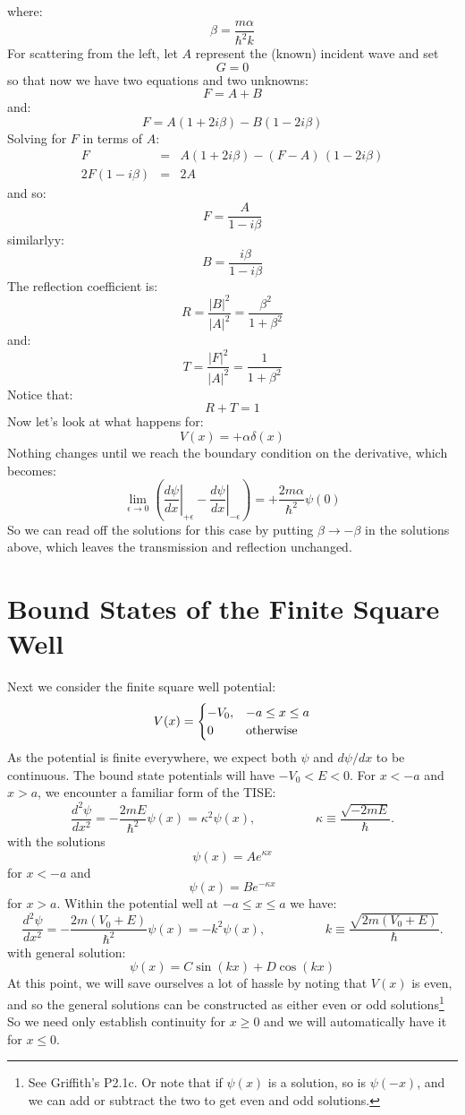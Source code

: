\documentclass[12pt]{book}
\begin{document}
where:
$$\beta = \frac{m \alpha}{\hbar^2 k}$$
For scattering from the left, let $A$ represent the (known) incident wave and set
$$G=0$$ so that now we have two equations and two unknowns:
$$F = A + B$$
and:
$$F = A (1+2i\beta) - B (1-2i\beta) $$
Solving for $F$ in terms of $A$:
\begin{eqnarray*}
F &=& A (1+2i\beta) - (F-A)\,(1-2i\beta)\\
2F(1-i\beta) &=& 2A 
\end{eqnarray*}
and so:
$$F = \frac{A}{1-i\beta}$$
similarlyy:
$$B = \frac{i\beta}{1-i\beta}$$
The reflection coefficient is:
$$R = \frac{|B|^2}{|A|^2} = \frac{\beta^2}{1+\beta^2}$$
and:
$$T = \frac{|F|^2}{|A|^2} = \frac{1}{1+\beta^2}$$
Notice that:
$$R+T=1$$
Now let's look at what happens for:
$$V(x) = +\alpha \delta(x)$$
Nothing changes until we reach the boundary condition on the derivative, which becomes:
$$
\lim_{\epsilon \to 0} \left( \left. \frac{d\psi}{d x} \right\rvert_{+\epsilon} 
- \left. \frac{d\psi}{d x} \right\rvert_{-\epsilon} \right) = 
+\frac{2m\alpha}{\hbar^2} \psi(0) 
$$
So we can read off the solutions for this case by putting $\beta \to -\beta$ in the solutions above, which leaves the transmission and reflection unchanged.


\section{Bound States of the Finite Square Well}

Next we consider the finite square well potential:
$$V(x) = \begin{cases}
-V_0, & -a \leq x \leq a \\
0     & {\rm otherwise} \\
\end{cases}
$$
As the potential is finite everywhere, we expect both $\psi$ and $d\psi/dx$ to be continuous.
The bound state potentials will have $-V_0 < E < 0$.  For $x < -a$ and $x > a$, we encounter a familiar form of the TISE:
\begin{equation*}
\frac{d^2 \psi}{d x^2} = -\frac{2mE}{\hbar^2}\psi(x) = \kappa^2 \psi(x), \hspace{2cm} \kappa \equiv \frac{\sqrt{-2mE}}{\hbar}.
\end{equation*}
with the solutions
$$\psi(x) = A e^{\displaystyle \kappa x}$$
for $x<-a$ and
$$\psi(x) = B e^{\displaystyle -\kappa x}$$
for $x>a$.  Within the potential well at $-a \leq x \leq a$ we have:
\begin{equation*}
\frac{d^2 \psi}{d x^2} = -\frac{2m(V_0+E)}{\hbar^2}\psi(x) = -k^2 \psi(x), \hspace{2cm} k \equiv \frac{\sqrt{2m(V_0 + E)}}{\hbar}.
\end{equation*}
with general solution:
$$\psi(x) = C \sin(kx) + D \cos(kx)$$
At this point, we will save ourselves a lot of hassle by noting that $V(x)$ is even, and so the general solutions can be constructed as either even or odd solutions\footnote{See Griffith's P2.1c.  Or note that if $\psi(x)$ is a solution, so is $\psi(-x)$, and we can add or subtract the two to get even and odd solutions.}  So we need only establish continuity for $x \geq 0$ and we will automatically have it for $x \leq 0$.
\end{document}
